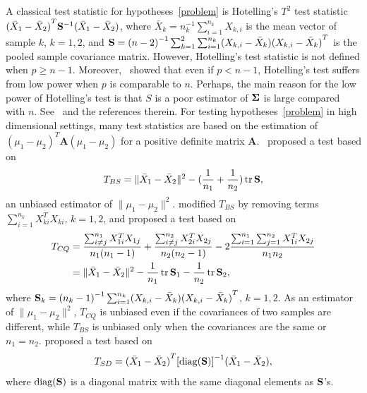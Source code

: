 \documentclass[review]{elsarticle}
\DeclareMathOperator{\mytr}{tr}
\newcommand{\BA}{\mathbf{A}}    \newcommand{\BB}{\mathbf{B}}    \newcommand{\BC}{\mathbf{C}}    \newcommand{\BD}{\mathbf{D}}    \newcommand{\BE}{\mathbf{E}}    \newcommand{\BF}{\mathbf{F}}    \newcommand{\BG}{\mathbf{G}}    \newcommand{\BH}{\mathbf{H}}    \newcommand{\BI}{\mathbf{I}}    \newcommand{\BJ}{\mathbf{J}}    \newcommand{\BK}{\mathbf{K}}    \newcommand{\BL}{\mathbf{L}}
\theoremstyle{plain}
\theoremstyle{definition}
\theoremstyle{remark}
\begin{document}
A classical test statistic for hypotheses~\eqref{problem} is Hotelling's $T^2$ test  statistic ${(\bar{X}_1-\bar{X}_2)}^T \mathbf{S}^{-1}(\bar{X}_1-\bar{X}_2)$, where $\bar{X}_k=n_k^{-1}\sum_{i=1}^{n_k}X_{k,i}$ is the mean vector of sample $k$, $k=1,2$, and
    $
    \mathbf{S}=
{(n-2)}^{-1}\sum_{k=1}^2\sum_{i=1}^{n_k} (X_{k,i}-\bar{X}_k) {(X_{k,i}-\bar{X}_k)}^T
    $
is the pooled sample covariance matrix.
However, Hotelling's test statistic is not defined when $p\geq n-1$.
Moreover,~\cite{Bai1996Efiect} showed that even if $p<n-1$, Hotelling's test suffers from low power when $p$ is comparable to $n$.
Perhaps, the main reason for the low power of Hotelling's test is that $S$ is a poor estimator of $\boldsymbol{\Sigma}$ is large compared with $n$.
See~\cite{Chen2010A} and the references therein.
For testing hypotheses~\eqref{problem} in high dimensional settings,  
many test statistics are based on the estimation of  ${(\mu_1-\mu_2)}^T \BA(\mu_1-\mu_2)$ for a positive definite matrix $\BA$.~\cite{Bai1996Efiect} proposed a test based on
\begin{equation*}
    T_{BS}=\|\bar{X}_1-\bar{X}_2\|^2-(\frac{1}{n_1}+\frac{1}{n_2})\mytr \BS,
\end{equation*}
an unbiased estimator of $\|\mu_1-\mu_2\|^2$.
\cite{Chen2010A} modified $T_{BS}$ by removing terms $\sum_{i=1}^{n_k}X_{ki}^T X_{ki}$, $k=1,2$, and proposed a test based on
\begin{equation*}
    \begin{aligned}
        T_{CQ}&=\frac{\sum_{i\neq j}^{n_1}X_{1i}^T X_{1j}}{n_1(n_1-1)}+\frac{\sum_{i\neq j}^{n_2}X_{2i}^T X_{2j}}{n_2(n_2-1)}-2\frac{\sum_{i=1}^{n_1}\sum_{j=1}^{n_2}X_{1i}^T X_{2j}}{n_1n_2}
        \\
            &=\|\bar{X}_1-\bar{X}_2\|^2-\frac{1}{n_1}\mytr \BS_1-\frac{1}{n_2}\mytr \BS_2,
    \end{aligned}
\end{equation*}
where
$\mathbf{S}_k={(n_k -1)}^{-1}\sum_{i=1}^{n_k} (X_{k,i}-\bar{X}_k) {(X_{k,i}-\bar{X}_k)}^T
$, $k=1,2$.
As an estimator of $\|\mu_1-\mu_2\|^2$, $T_{CQ}$ is unbiased even if the covariances of two samples are different,
while $T_{BS}$ is unbiased only when the covariances are the same or $n_1=n_2$.
\cite{Srivastava2008A} proposed a test based on
\begin{equation*}
    T_{SD}={(\bar{X}_1-\bar{X}_2)}^T {[\mathrm{diag}(\mathbf{S})]}^{-1}(\bar{X}_1-\bar{X}_2),
\end{equation*}
where $\textrm{diag} (\mathbf{S})$ is a diagonal matrix with the same diagonal elements as $\mathbf{S}$'s.
\end{document}
